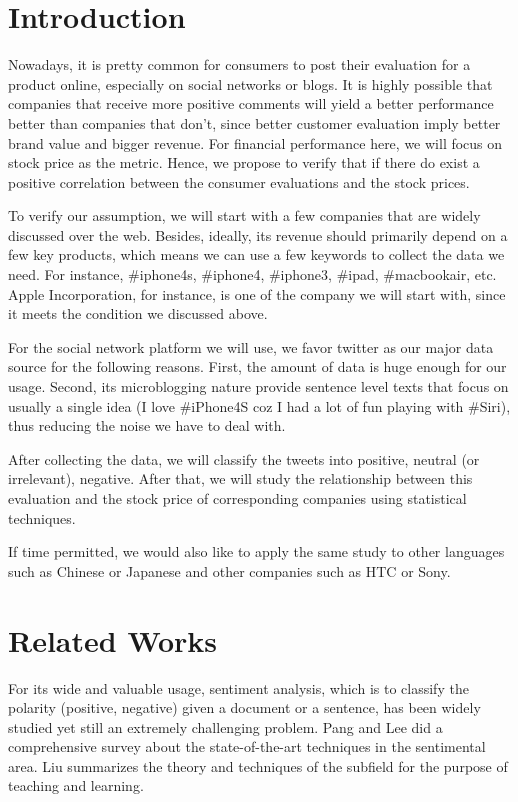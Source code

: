 \documentclass[12pt]{article}
\begin{document}
\maketitle



\section{Introduction}
Nowadays, it is pretty common for consumers to post their evaluation for a product online, especially on social networks or blogs. It is highly possible that companies that receive more positive comments will yield a better performance better than companies that don't, since better customer evaluation imply better brand value and bigger revenue. For financial performance here, we will focus on stock price as the metric. Hence, we propose to verify that if there do exist a positive correlation between the consumer evaluations and the stock prices.

To verify our assumption, we will start with a few companies that are widely discussed over the web. Besides, ideally, its revenue should primarily depend on a few key products, which means we can use a few keywords to collect the data we need. For instance, \#iphone4s, \#iphone4, \#iphone3, \#ipad, \#macbookair, etc. Apple Incorporation, for instance, is one of the company we will start with, since it meets the condition we discussed above. 

For the social network platform we will use, we favor twitter as our major data source for the following reasons. First, the amount of data is huge enough for our usage. Second, its microblogging nature provide sentence level texts that focus on usually a single idea (I love \#iPhone4S coz I had a lot of fun playing with \#Siri), thus reducing the noise we have to deal with.

After collecting the data, we will classify the tweets into positive, neutral (or irrelevant), negative. After that, we will study the relationship between this evaluation and the stock price of corresponding companies using statistical techniques.

If time permitted, we would also like to apply the same study to other languages such as Chinese or Japanese and other companies such as HTC or Sony.

\section{Related Works}
For its wide and valuable usage, sentiment analysis, which is to classify the polarity (positive, negative) given a document or a sentence, has been widely studied yet still an extremely challenging problem. Pang and Lee \cite{Pang:08} did a comprehensive survey about the state-of-the-art techniques in the sentimental area. Liu \cite{Liu:10} summarizes the theory and techniques of the subfield for the purpose of teaching and learning.
\end{document}
